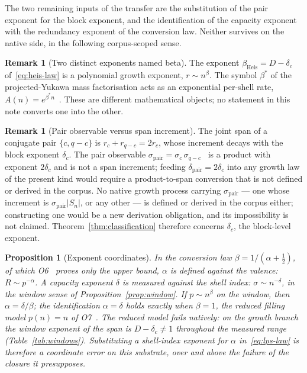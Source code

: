 \documentclass[11pt,a4paper]{article}
\newtheorem{proposition}[theorem]{Proposition}
\theoremstyle{definition}
\newtheorem{remark}[theorem]{Remark}
\newcommand{\dc}{\delta_c}
\newcommand{\bstar}{\beta^{*}}
\begin{document}
The two remaining inputs of the transfer are the substitution of the pair exponent for the block exponent,
and the identification of the capacity exponent with the redundancy exponent of the conversion law.
Neither survives on the native side, in the following corpus-scoped sense.

\begin{remark}[Two distinct exponents named beta]
  \label{rem:beta-category}
  The exponent $\beta_{\mathrm{Heis}} = D - \dc$ of~\eqref{eq:heis-law} is a polynomial growth exponent,
  $r \sim n^{\beta}$.
  The symbol $\bstar$ of the projected-Yukawa mass factorisation acts as an exponential per-shell rate,
  $A(n) = e^{\bstar n}$~\cite{Beau2026pyo}.
  These are different mathematical objects; no statement in this note converts one into the other.
\end{remark}

\begin{remark}[Pair observable versus span increment]
  \label{rem:pair}
  The joint span of a conjugate pair $\{c, q-c\}$ is $r_c + r_{q-c} = 2r_c$, whose increment decays with the
  block exponent $\dc$.
  The pair observable $\sigma_{\mathrm{pair}} = \sigma_c\,\sigma_{q-c}$~\cite{Beau2026a20} is a product with
  exponent $2\dc$ and is not a span increment; feeding $\delta_{\mathrm{pair}} = 2\dc$ into any growth law of
  the present kind would require a product-to-span conversion that is not defined or derived in the corpus.
  No native growth process carrying $\sigma_{\mathrm{pair}}$ --- one whose increment is
  $\sigma_{\mathrm{pair}}|S_n|$, or any other --- is defined or derived in the corpus either; constructing
  one would be a new derivation obligation, and its impossibility is not claimed.
  Theorem~\ref{thm:classification} therefore concerns $\dc$, the block-level exponent.
\end{remark}

\begin{proposition}[Exponent coordinates]
  \label{prop:coordinates}
  In the conversion law $\beta = 1/(\alpha + \tfrac12)$, of which O6~\cite{Beau2026a10} proves only the
  upper bound, $\alpha$ is defined
  against the valence: $R \sim p^{-\alpha}$.
  A capacity exponent $\delta$ is measured against the shell index: $\sigma \sim n^{-\delta}$, in the
  window sense of Proposition~\ref{prop:window}.
  If $p \sim n^{\beta}$ on the window, then $\alpha = \delta/\beta$; the identification $\alpha = \delta$
  holds exactly when $\beta = 1$, the reduced filling model $p(n) = n$ of O7~\cite{Beau2026a11}.
  The reduced model fails natively: on the growth branch the window exponent of the span is
  $D - \dc \ne 1$ throughout the measured range (Table~\ref{tab:windows}).
  Substituting a shell-index exponent for $\alpha$ in~\eqref{eq:lps-law} is therefore a coordinate error
  on this substrate, over and above the failure of the closure it presupposes.
\end{proposition}
\end{document}
